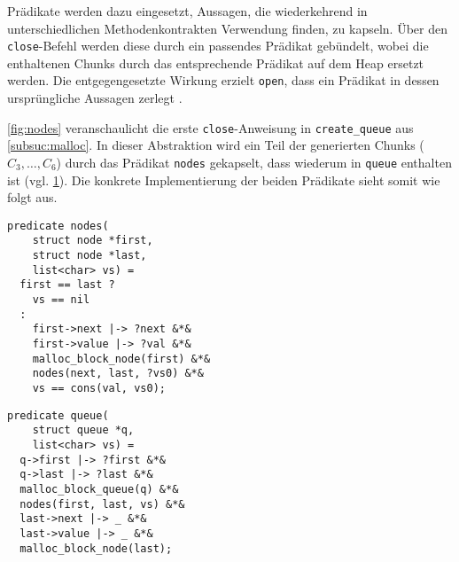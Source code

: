 Prädikate werden dazu eingesetzt, Aussagen, die wiederkehrend in unterschiedlichen Methodenkontrakten Verwendung finden, zu kapseln. Über den \texttt{close}-Befehl werden diese durch ein passendes Prädikat gebündelt, wobei die enthaltenen Chunks durch das entsprechende Prädikat auf dem Heap ersetzt werden. Die entgegengesetzte Wirkung erzielt \texttt{open}, dass ein Prädikat in dessen ursprüngliche Aussagen zerlegt \cite{Jacobs2008,Jacobs2017}.

\begin{figure}[t]
	\centering
	\begin{minipage}{.45\textwidth}
		\centering
		
		\label{fig:nodes}
	\end{minipage}
	\hfill
	\begin{minipage}{.45\textwidth}
		\centering
		
		\label{fig:queue}
	\end{minipage}
\end{figure}

\cref{fig:nodes} veranschaulicht die erste \texttt{close}-Anweisung in \texttt{create\_queue} aus \cref{subsuc:malloc}. In dieser Abstraktion wird ein Teil der generierten Chunks ($C_{3},\ldots,C_{6}$) durch das Prädikat \texttt{nodes} gekapselt, dass wiederum in \texttt{queue} enthalten ist (vgl. \cref{fig:queue}). Die konkrete Implementierung der beiden Prädikate sieht somit wie folgt aus.

\vspace{-10pt}
{\noindent
\begin{minipage}[t]{.45\textwidth}
\begin{lstlisting}
predicate nodes(
    struct node *first,
    struct node *last,
    list<char> vs) =
  first == last ?
    vs == nil
  :
    first->next |-> ?next &*&
    first->value |-> ?val &*&
    malloc_block_node(first) &*&
    nodes(next, last, ?vs0) &*&
    vs == cons(val, vs0);
\end{lstlisting}
\end{minipage}
\hfill
\begin{minipage}[t]{.45\textwidth}
\begin{lstlisting}
predicate queue(
    struct queue *q,
    list<char> vs) =
  q->first |-> ?first &*&
  q->last |-> ?last &*&
  malloc_block_queue(q) &*&
  nodes(first, last, vs) &*&
  last->next |-> _ &*&
  last->value |-> _ &*&
  malloc_block_node(last);
\end{lstlisting}
\end{minipage}
}

